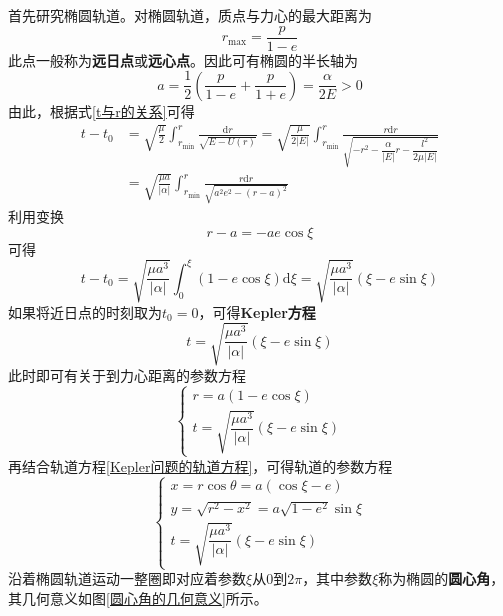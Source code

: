 首先研究椭圆轨道。对椭圆轨道，质点与力心的最大距离为
\begin{equation*}
	r_{\max} = \frac{p}{1-e}
\end{equation*}
此点一般称为{\bf 远日点}或{\bf 远心点}。因此可有椭圆的半长轴为
\begin{equation*}
	a = \frac12 \left(\frac{p}{1-e}+\frac{p}{1+e}\right) = \frac{\alpha}{2E} > 0
\end{equation*}
由此，根据式\eqref{t与r的关系}可得
\begin{align*}
	t-t_0 & = \sqrt{\frac{\mu}{2}} \int_{r_{\min}}^r \frac{\mathrm{d}r}{\sqrt{E-U(r)}} = \sqrt{\frac{\mu}{2|E|}} \int_{r_{\min}}^r \frac{r\mathrm{d}r}{\sqrt{-r^2-\dfrac{\alpha}{|E|}r-\dfrac{l^2}{2\mu|E|}}} \\
	& = \sqrt{\frac{\mu a}{|\alpha|}} \int_{r_{\min}}^r \frac{r\mathrm{d}r}{\sqrt{a^2e^2-(r-a)^2}}
\end{align*}
利用变换
\begin{equation*}
	r-a = -ae\cos \xi
\end{equation*}
可得
\begin{equation*}
	t-t_0 = \sqrt{\frac{\mu a^3}{|\alpha|}} \int_0^\xi (1-e\cos\xi) \mathrm{d}\xi = \sqrt{\frac{\mu a^3}{|\alpha|}} (\xi-e\sin \xi)
\end{equation*}
如果将近日点的时刻取为$t_0=0$，可得{\bf Kepler方程}
\begin{equation}
	t = \sqrt{\frac{\mu a^3}{|\alpha|}} (\xi-e\sin \xi)
	\label{Kepler方程}
\end{equation}
此时即可有关于到力心距离的参数方程
\begin{equation}
\begin{cases}
	r=a(1-e\cos \xi) \\
	t = \sqrt{\dfrac{\mu a^3}{|\alpha|}} (\xi-e\sin \xi)
\end{cases}
\end{equation}
再结合轨道方程\eqref{Kepler问题的轨道方程}，可得轨道的参数方程
\begin{equation}
\begin{cases}
	x = r\cos \theta = a(\cos \xi-e) \\
	y = \sqrt{r^2-x^2} = a\sqrt{1-e^2}\sin \xi \\
	t = \sqrt{\dfrac{\mu a^3}{|\alpha|}} (\xi-e\sin \xi)
\end{cases}
\end{equation}
沿着椭圆轨道运动一整圈即对应着参数$\xi$从$0$到$2\pi$，其中参数$\xi$称为椭圆的{\bf 圆心角}，其几何意义如图\ref{圆心角的几何意义}所示。

